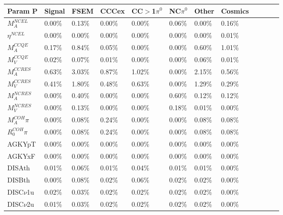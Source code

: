 \documentclass{article}
\begin{document}
\begin{table*}
\centering
{}
 \begin{tabular}{| l | l | l | l | l | l | l | l | l | l | l | l | }
 \hline
  Param P &Signal& FSEM & CCCex & CC$>$1$\pi^0$ & NC$\pi^0$& Other & Cosmics \\ [0.1ex] \hline
$M_A^{NCEL}$ & 0.00\% &  0.13\% &  0.00\% &  0.00\% &  0.06\% &  0.00\% &  0.16\%  \\
$\eta^{NCEL}$  & 0.00\% &  0.00\% &  0.00\% &  0.00\% &  0.00\% &  0.00\% &  0.01\% \\
$M_A^{CCQE}$  & 0.17\% &  0.84\% &  0.05\% &  0.00\% &  0.00\% &  0.60\% &  1.01\% \\
$M_V^{CCQE}$  & 0.02\% &  0.07\% &  0.01\% &  0.00\% &  0.00\% &  0.06\% &  0.01\% \\
$M_A^{CCRES}$  & 0.63\% &  3.03\% &  0.87\% &  1.02\% &  0.00\% &  2.15\% &  0.56\% \\
$M_V^{CCRES}$ & 0.41\% &  1.80\% &  0.48\% &  0.63\% &  0.00\% &  1.29\% &  0.29\% \\
$M_A^{NCRES}$ & 0.00\% &  0.40\% &  0.00\% &  0.00\% &  0.60\% &  0.12\% &  0.12\% \\
$M_V^{NCRES}$ & 0.00\% &  0.13\% &  0.00\% &  0.00\% &  0.18\% &  0.01\% &  0.00\%\\
$M_A^{COH}\pi$ & 0.00\% &  0.08\% &  0.24\% &  0.00\% &  0.00\% &  0.08\% &  0.08\%  \\
$R_0^{COH}\pi$ & 0.00\% &  0.08\% &  0.24\% &  0.00\% &  0.00\% &  0.08\% &  0.08\%  \\

AGKYpT & 0.00\% &  0.00\% &  0.00\% &  0.00\% &  0.00\% &  0.00\% &  0.00\% \\ %
AGKYxF & 0.00\% &  0.00\% &  0.00\% &  0.00\% &  0.00\% &  0.00\% &  0.00\% \\ %
DISAth & 0.01\% &  0.06\% &  0.01\% &  0.04\% &  0.01\% &  0.01\% &  0.00\% \\ %
DISBth & 0.00\% &  0.08\% &  0.02\% &  0.06\% &  0.02\% &  0.02\% &  0.00\% \\ %
DISC$\nu$1u & 0.02\% &  0.03\% &  0.02\% &  0.02\% &  0.02\% &  0.02\% &  0.00\%  \\ %
DISC$\nu$2u & 0.01\% &  0.03\% &  0.02\% &  0.02\% &  0.02\% &  0.02\% &  0.00\%  \\ \hline


\end{tabular}
\end{table*}
\end{document}
